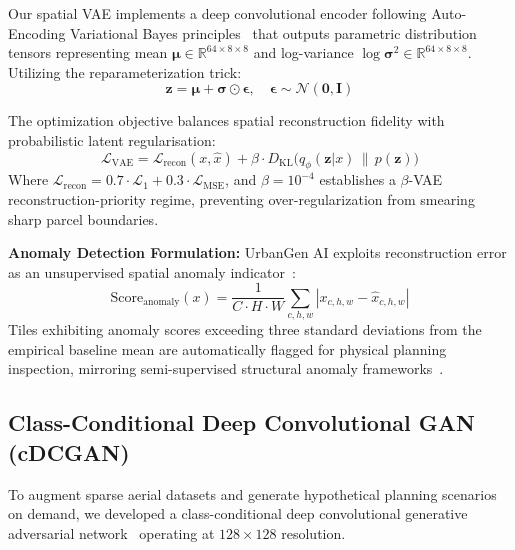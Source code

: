 \documentclass[conference]{IEEEtran}
\begin{document}
Our spatial VAE implements a deep convolutional encoder following Auto-Encoding Variational Bayes principles~\cite{kingma2013auto} that outputs parametric distribution tensors representing mean $\boldsymbol{\mu} \in \mathbb{R}^{64 \times 8 \times 8}$ and log-variance $\log \boldsymbol{\sigma}^2 \in \mathbb{R}^{64 \times 8 \times 8}$. Utilizing the reparameterization trick:
\begin{equation}
\mathbf{z} = \boldsymbol{\mu} + \boldsymbol{\sigma} \odot \boldsymbol{\epsilon}, \quad \boldsymbol{\epsilon} \sim \mathcal{N}(\mathbf{0}, \mathbf{I})
\end{equation}

The optimization objective balances spatial reconstruction fidelity with probabilistic latent regularisation:
\begin{equation}
\mathcal{L}_{\text{VAE}} = \mathcal{L}_{\text{recon}}(x, \hat{x}) + \beta \cdot D_{\text{KL}}\big(q_\phi(\mathbf{z}|x) \,\|\, p(\mathbf{z})\big)
\end{equation}
Where $\mathcal{L}_{\text{recon}} = 0.7 \cdot \mathcal{L}_1 + 0.3 \cdot \mathcal{L}_{\text{MSE}}$, and $\beta = 10^{-4}$ establishes a $\beta$-VAE~\cite{higgins2017beta} reconstruction-priority regime, preventing over-regularization from smearing sharp parcel boundaries.

\textbf{Anomaly Detection Formulation:} UrbanGen AI exploits reconstruction error as an unsupervised spatial anomaly indicator~\cite{an2015variational}:
\begin{equation}
\text{Score}_{\text{anomaly}}(x) = \frac{1}{C \cdot H \cdot W} \sum_{c,h,w} |x_{c,h,w} - \hat{x}_{c,h,w}|
\end{equation}
Tiles exhibiting anomaly scores exceeding three standard deviations from the empirical baseline mean are automatically flagged for physical planning inspection, mirroring semi-supervised structural anomaly frameworks~\cite{akcay2018ganomaly}.

\subsection{Class-Conditional Deep Convolutional GAN (cDCGAN)}
To augment sparse aerial datasets and generate hypothetical planning scenarios on demand, we developed a class-conditional deep convolutional generative adversarial network~\cite{goodfellow2014generative} operating at $128 \times 128$ resolution.
\end{document}
